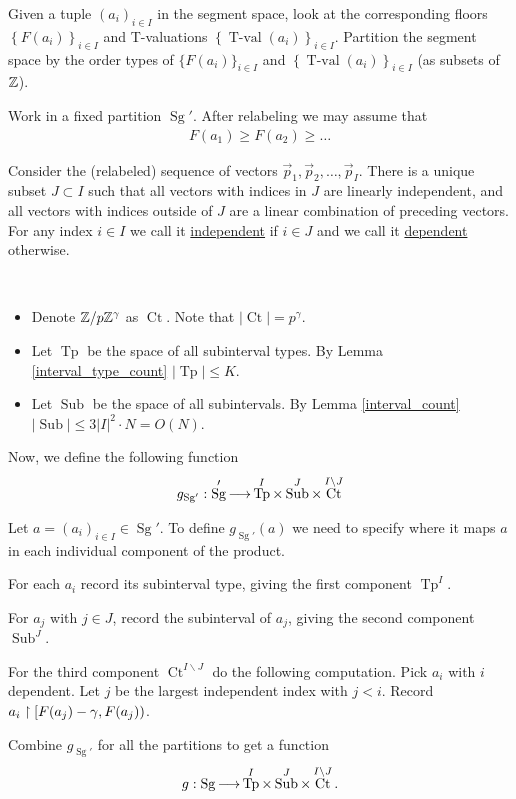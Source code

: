\documentclass{amsart}
\newcommand{\curly}[1]{\left\{#1\right\}}
\DeclareMathOperator{\Sg}{Sg}
\DeclareMathOperator{\It}{Tp}
\DeclareMathOperator{\Sub}{Sub}
\DeclareMathOperator{\Ct}{Ct}
\DeclareMathOperator{\tval}{T-val}
\newcommand{\defn}{\underline}
\begin{document}
Given a tuple $(a_i)_{i\in I}$ in the segment space,
look at the corresponding floors $\curly{F(a_i)}_{i\in I}$ and T-valuations $\curly{\tval(a_i)}_{i\in I}$.
Partition the segment space by the order types of $\{F(a_i)\}_{i\in I}$ and $\curly{\tval(a_i)}_{i\in I}$ (as subsets of $\mathbb{Z}$).

Work in a fixed partition $\Sg'$.
After relabeling we may assume that
\begin{align*}
  F(a_1) \geq F(a_2) \geq \ldots 
\end{align*}

Consider the (relabeled) sequence of vectors $\vec p_1, \vec p_2, \ldots, \vec p_I$.
There is a unique subset $J \subset I$ such that all vectors with indices in $J$ are linearly independent,
and all vectors with indices outside of $J$ are a linear combination of preceding vectors.
For any index $i \in I$ we call it \defn{independent} if $i \in J$ and we call it \defn{dependent} otherwise.


\begin{Definition} \ 
  \begin{itemize}
  \item Denote $\mathbb{Z}/p\mathbb{Z}^\gamma$ as \defn{$\Ct$}.
    Note that $|\Ct| = p^\gamma$.
  \item Let \defn{$\It$} be the space of all subinterval types.
    By Lemma \ref{interval_type_count} $|\It| \leq K$.
  \item Let \defn{$\Sub$} be the space of all subintervals.
    By Lemma \ref{interval_count} $|\Sub| \leq 3 |I|^2 \cdot N = O(N)$.
  \end{itemize}
\end{Definition}

\begin{Definition}
  Now, we define the following function
  \begin{align*}
    g_{\Sg'}: \Sg' \arr \It^I \times \Sub^J \times \Ct^{I \backslash J}
  \end{align*}

  Let $a = (a_i)_{i\in I} \in \Sg'$.
  To define $g_{\Sg'}(a)$ we need to specify where it maps $a$ in each individual component of the product.

  For each $a_i$ record its subinterval type, giving the first component $\It^I$.

  For $a_j$ with $j \in J$, record the subinterval of $a_j$, giving the second component $\Sub^J$.

  For the third component $\Ct^{I \backslash J}$ do the following computation.
  Pick $a_i$ with $i$ dependent.
  Let $j$ be the largest independent index with $j < i$.
  Record $a_i \upharpoonright [F(a_j) - \gamma, F(a_j))$.

  Combine $g_{\Sg'}$ for all the partitions to get a function 
  \begin{align*}
    g: \Sg \arr \It^I \times \Sub^J \times \Ct^{I \backslash J}.  
  \end{align*}
\end{Definition}
\end{document}
